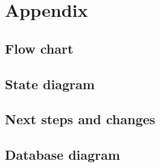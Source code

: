 \section{Appendix}

\subsection{Flow chart}

\subsection{State diagram}

\subsection{Next steps and changes}

\subsection{Database diagram}
